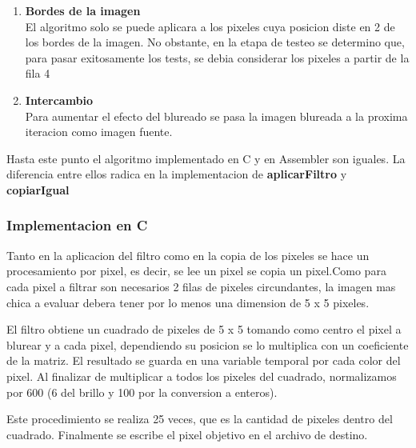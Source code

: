 \begin{enumerate}
\item \textbf{Bordes de la imagen} \\
El algoritmo solo se puede aplicara a los pixeles cuya posicion diste en 2 de los bordes de la imagen. No obstante, en la etapa de testeo se determino que, para pasar exitosamente los tests, se debia considerar los pixeles a partir de la fila 4\\

\item \textbf{Intercambio} \\
Para aumentar el efecto del blureado se pasa la imagen blureada a la proxima iteracion como imagen fuente.\\

\end{enumerate}

Hasta este punto el algoritmo implementado en C y en Assembler son iguales. La diferencia entre ellos radica en la implementacion de \textbf{aplicarFiltro} y \textbf{copiarIgual}\\

\subsubsection{Implementacion en C}

Tanto en la aplicacion del filtro como en la copia de los pixeles se hace un procesamiento por pixel, es decir, se lee un pixel se copia un pixel.Como para cada pixel a filtrar son necesarios 2 filas de pixeles circundantes, la imagen mas chica a evaluar debera tener por lo menos una dimension de 5 x 5 pixeles.



\par
\bigskip
El filtro obtiene un cuadrado de pixeles de 5 x 5 tomando como centro el pixel a blurear y a cada pixel, dependiendo su posicion se lo multiplica con un coeficiente de la matriz. El resultado se guarda en una variable temporal por cada color del pixel. Al finalizar de multiplicar a todos los pixeles del cuadrado, normalizamos por 600 (6 del brillo y 100 por la conversion a enteros).

Este procedimiento se realiza 25 veces, que es la cantidad de pixeles dentro del cuadrado. Finalmente se escribe el pixel objetivo en el archivo de destino.

